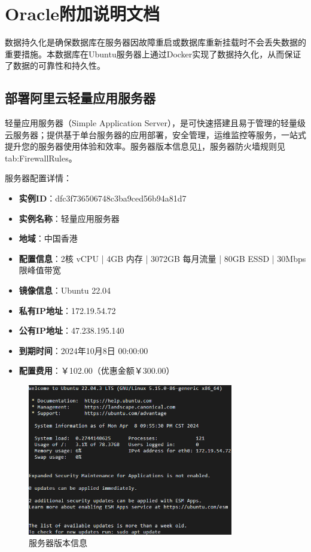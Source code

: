 \section{Oracle附加说明文档}

数据持久化是确保数据库在服务器因故障重启或数据库重新挂载时不会丢失数据的重要措施。本数据库在Ubuntu服务器上通过Docker实现了数据持久化，从而保证了数据的可靠性和持久性。

\subsection{部署阿里云轻量应用服务器}

轻量应用服务器（Simple Application Server），是可快速搭建且易于管理的轻量级云服务器；提供基于单台服务器的应用部署，安全管理，运维监控等服务，一站式提升您的服务器使用体验和效率。服务器版本信息见\cref{fig:ServerVersion}，服务器防火墙规则见{tab:FirewallRules}。

服务器配置详情：

\begin{itemize}
	\item \textbf{实例ID}：dfc3f736506748c3ba9ced56b94a81d7
	\item \textbf{实例名称}：轻量应用服务器
	\item \textbf{地域}：中国香港
	\item \textbf{配置信息}：2核 vCPU | 4GB 内存 | 3072GB 每月流量 | 80GB ESSD | 30Mbps 限峰值带宽
	\item \textbf{镜像信息}：Ubuntu 22.04
	\item \textbf{私有IP地址}：172.19.54.72
	\item \textbf{公有IP地址}：47.238.195.140
	\item \textbf{到期时间}：2024年10月8日 00:00:00
	\item \textbf{配置费用}：￥102.00（优惠金额￥300.00）
\end{itemize}

\begin{figure}[htbp]
	\centering
	\includegraphics[width=0.8\textwidth]{figures/ServerVersion.png}
	\caption{服务器版本信息}
	\label{fig:ServerVersion}
\end{figure}

